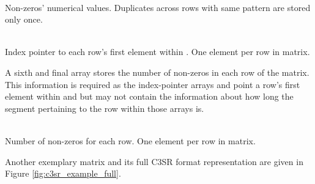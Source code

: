 \documentclass{article}
\begin{document}
    \begin{description}[align = left, labelwidth = 4cm]
      \item [\V - \emph{Values}] \hfill \\
        Non-zeros' numerical values. Duplicates across rows with same pattern are stored only once.
      \item [\VS - \emph{Values Index Pointer}] \hfill \\
        Index pointer to each row's first element within \V. One element per row in matrix.
    \end{description}

    A sixth and final array \RS stores the number of non-zeros in each row of the matrix. This information is required as the index-pointer arrays \JS and \VS point a row's first element within \J and \V but may not contain the information about how long the segment pertaining to the row within those arrays is.

    \begin{description}[align = left, labelwidth = 4cm]
      \item [\RS - \emph{Row Size}] \hfill \\
        Number of non-zeros for each row. One element per row in matrix.
    \end{description}

    Another exemplary matrix and its full C3SR format representation are given in Figure \ref{fig:c3sr_example_full}.
\end{document}
